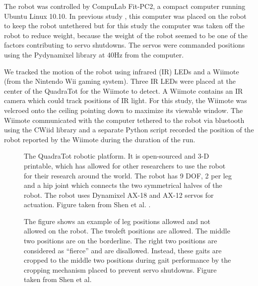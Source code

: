 The robot was controlled by CompuLab Fit-PC2, a compact computer running Ubuntu Linux 10.10. 
In previous study \cite{yos:clune}, this computer was placed on the robot to keep the robot untethered but for this study the computer was taken off the robot to reduce weight, because the weight of the robot seemed to be one of the factors contributing to servo shutdowns. 
The servos were commanded positions using the Pydynamixel library at 40Hz from the computer. 


We tracked the motion of the robot using infrared (IR) LEDs and a Wiimote (from the Nintendo Wii gaming system).
Three IR LEDs were placed at the center of the QuadraTot for the Wiimote to detect. 
A Wiimote contains an IR camera which could track positions of IR light. 
For this study, the Wiimote was velcroed onto the ceiling pointing down to maximize its viewable window. 
The Wiimote communicated with the computer tethered to the robot via bluetooth using the CWiid library and a separate Python script recorded the position of the robot reported by the Wiimote during the duration of the run. 

\begin{figure}
\begin{center}
\vspace{1cm}
\caption[ ]{The QuadraTot robotic platform. It is open-sourced and 3-D printable, which has allowed for other researchers to use the robot for their research around the world. The robot has 9 DOF, 2 per leg and a hip joint which connects the two symmetrical halves of the robot. The robot uses Dynamixel AX-18 and AX-12 servos for actuation. Figure taken from Shen et al. \cite{haocheng}.}
\label{fig:quadratot}
\end{center}
\end{figure}
%


\begin{figure}
\begin{center}
\vspace{1cm}
\caption[ ]{The figure shows an example of leg positions allowed and not allowed on the robot. The twoleft positions are allowed. The middle two positions are on the borderline. The right two positions are considered as ``fierce'' and are disallowed. Instead, these gaits are cropped to the middle two positions during gait performance by the cropping mechanism placed to prevent servo shutdowns. Figure taken from Shen et al. \cite{haocheng}}
\end{center}
\end{figure}
%


